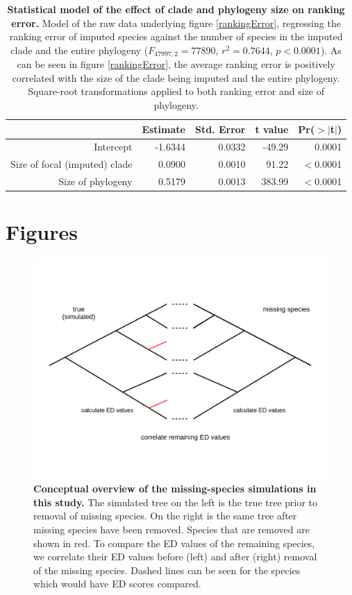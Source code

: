 \documentclass[10pt,english]{article}
\begin{document}
\begin{table}[ht]
  \centering
  \begin{tabular}{rrrrr}
    \hline
   & Estimate & Std. Error & t value & Pr($>$$|$t$|$) \\ \hline
    Intercept & -1.6344 & 0.0332 & -49.29 & 0.0001 \\
    Size of focal (imputed) clade & 0.0900 & 0.0010 & 91.22 & $<$0.0001 \\
    Size of phylogeny & 0.5179 & 0.0013 & 383.99 & $<$0.0001 \\ \hline
  \end{tabular}
  \caption{\textbf{Statistical model of the effect of clade and phylogeny size
      on ranking error.} Model of the raw data underlying figure
      \ref{rankingError}, regressing the ranking error of imputed species
      against the number of species in the imputed clade and the entire
      phylogeny ($F_{47997,2} = 77890$, $r^2 = 0.7644$, $p < 0.0001$). As can be
      seen in figure \ref{rankingError}, the average ranking error is positively
      correlated with the size of the clade being imputed and the entire
      phylogeny. Square-root transformations  applied to both ranking
      error and size of phylogeny.}
  \label{impute_rank}
\end{table}

\clearpage

\section*{Figures}

\begin{figure}[!ht]
  \center
  \includegraphics[width=.75\textwidth]{../figures/missingSpecies.png}
  \caption{\textbf{Conceptual overview of the missing-species simulations in
  this study.} The simulated tree on the left is the true tree prior to removal
  of missing species. On the right is the same tree after missing species have
  been removed. Species that are removed are shown in red. To compare the ED
  values of the remaining species, we correlate their ED values before (left)
  and after (right) removal of the missing species. Dashed lines can be seen for
  the species which would have ED scores compared.}
  \label{missingSpecies}
\end{figure}
\end{document}
